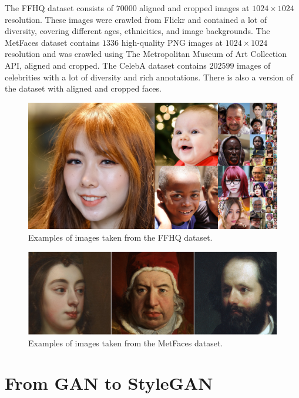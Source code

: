 \documentclass[conference]{IEEEtran}
\begin{document}
The FFHQ dataset consists of $70 000$ aligned and cropped images at $1024 \times 1024$ resolution. These images were crawled from Flickr and contained a lot of diversity, covering different ages, ethnicities, and image backgrounds.
The MetFaces dataset contains $1336$ high-quality PNG images at $1024 \times 1024$ resolution and was crawled using The Metropolitan Museum of Art Collection API, aligned and cropped.
The CelebA dataset contains $202 599$ images of celebrities with a lot of diversity and rich annotations. There is also a version of the dataset with aligned and cropped faces.

\begin{figure}[!h]
	\begin{center}
		\includegraphics[width=1\columnwidth]{./images/ffhq-teaser.png}
		\caption{Examples of images taken from the FFHQ dataset.}
		\label{fig:figure2}
	\end{center}
\end{figure}

\begin{figure}[!h]
	\begin{center}
		\includegraphics[width=1\columnwidth]{./images/metfaces-teaser.png}
		\caption{Examples of images taken from the MetFaces dataset.}
		\label{fig:figure3}
	\end{center}
\end{figure}

\section{From GAN to StyleGAN}
\end{document}
